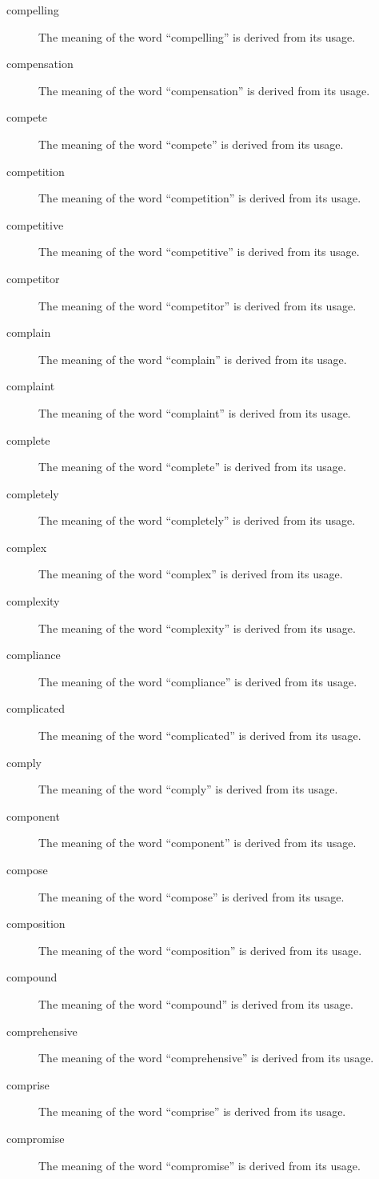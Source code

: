 \documentclass[12pt, letterpaper]{memoir}
\begin{document}
\begin{description}
\item[compelling] The meaning of the word ``compelling'' is derived from its usage.
\item[compensation] The meaning of the word ``compensation'' is derived from its usage.
\item[compete] The meaning of the word ``compete'' is derived from its usage.
\item[competition] The meaning of the word ``competition'' is derived from its usage.
\item[competitive] The meaning of the word ``competitive'' is derived from its usage.
\item[competitor] The meaning of the word ``competitor'' is derived from its usage.
\item[complain] The meaning of the word ``complain'' is derived from its usage.
\item[complaint] The meaning of the word ``complaint'' is derived from its usage.
\item[complete] The meaning of the word ``complete'' is derived from its usage.
\item[completely] The meaning of the word ``completely'' is derived from its usage.
\item[complex] The meaning of the word ``complex'' is derived from its usage.
\item[complexity] The meaning of the word ``complexity'' is derived from its usage.
\item[compliance] The meaning of the word ``compliance'' is derived from its usage.
\item[complicated] The meaning of the word ``complicated'' is derived from its usage.
\item[comply] The meaning of the word ``comply'' is derived from its usage.
\item[component] The meaning of the word ``component'' is derived from its usage.
\item[compose] The meaning of the word ``compose'' is derived from its usage.
\item[composition] The meaning of the word ``composition'' is derived from its usage.
\item[compound] The meaning of the word ``compound'' is derived from its usage.
\item[comprehensive] The meaning of the word ``comprehensive'' is derived from its usage.
\item[comprise] The meaning of the word ``comprise'' is derived from its usage.
\item[compromise] The meaning of the word ``compromise'' is derived from its usage.

\end{description}
\end{document}
